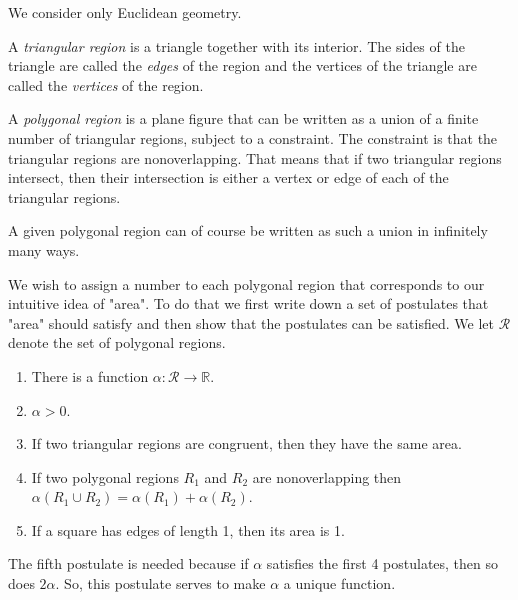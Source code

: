 \documentclass[12pt]{article}
\begin{document}
We consider only Euclidean geometry.

A \emph{triangular region} is a triangle together with its interior.
The sides of the triangle are called the \emph{edges} of the region and the vertices of the
triangle are called the \emph{vertices} of the region.

A \emph{polygonal region} is a plane figure that can be written as a union of a finite 
number of triangular regions, subject to a constraint. The constraint is that
the triangular regions are nonoverlapping. That means that if two triangular regions
intersect, then their intersection is either a vertex or edge of each of the triangular regions.

A given polygonal region can of course be written as such a union in infinitely many ways.

We wish to assign a number to each polygonal region that corresponds to our intuitive idea of
"area". To do that we first write down a set of postulates that "area" should satisfy and then
show that the postulates  can be satisfied. We let $\mathscr{R}$ denote the set of polygonal regions.
\begin{enumerate}
\item There is a function $\alpha: \mathscr{R} \to \mathbb{R}$. 
\item $\alpha > 0$.
\item If two triangular regions are congruent, then they have the same area.
\item If two polygonal regions $R_1$ and $R_2$ are nonoverlapping then 
$\alpha ( R_1 \cup R_2) = \alpha (R_1) + \alpha (R_2)$. 
\item If a square  has edges of length 1, then its area is 1.
\end{enumerate}

The fifth postulate is needed because if $\alpha$ satisfies the first 4 postulates, then so does 
$2\alpha$. So, this postulate serves to make $\alpha$ a unique function. 
\end{document}
